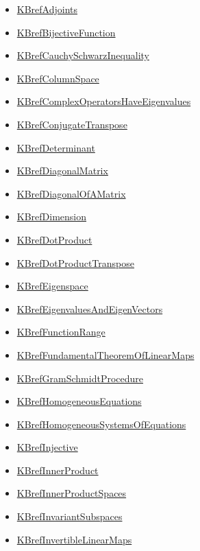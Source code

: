 \documentclass[11pt]{article}
\begin{document}
\begin{itemize}
\begin{itemize}
\item \href{math530/KBrefAdjoints.org}{KBrefAdjoints}
\item \href{math530/KBrefBijectiveFunction.org}{KBrefBijectiveFunction}
\item \href{math530/KBrefCauchySchwarzInequality.org}{KBrefCauchySchwarzInequality}
\item \href{math530/KBrefColumnSpace.org}{KBrefColumnSpace}
\item \href{math530/KBrefComplexOperatorsHaveEigenvalues.org}{KBrefComplexOperatorsHaveEigenvalues}
\item \href{math530/KBrefConjugateTranspose.org}{KBrefConjugateTranspose}
\item \href{math530/KBrefDeterminant.org}{KBrefDeterminant}
\item \href{math530/KBrefDiagonalMatrix.org}{KBrefDiagonalMatrix}
\item \href{math530/KBrefDiagonalOfAMatrix.org}{KBrefDiagonalOfAMatrix}
\item \href{math530/KBrefDimension.org}{KBrefDimension}
\item \href{math530/KBrefDotProduct.org}{KBrefDotProduct}
\item \href{math530/KBrefDotProductTranspose.org}{KBrefDotProductTranspose}
\item \href{math530/KBrefEigenspace.org}{KBrefEigenspace}
\item \href{math530/KBrefEigenvaluesAndEigenVectors.org}{KBrefEigenvaluesAndEigenVectors}
\item \href{math530/KBrefFunctionRange.org}{KBrefFunctionRange}
\item \href{math530/KBrefFundamentalTheoremOfLinearMaps.org}{KBrefFundamentalTheoremOfLinearMaps}
\item \href{math530/KBrefGramSchmidtProcedure.org}{KBrefGramSchmidtProcedure}
\item \href{math530/KBrefHomogeneousEquations.org}{KBrefHomogeneousEquations}
\item \href{math530/KBrefHomogeneousSystemsOfEquations.org}{KBrefHomogeneousSystemsOfEquations}
\item \href{math530/KBrefInjective.org}{KBrefInjective}
\item \href{math530/KBrefInnerProduct.org}{KBrefInnerProduct}
\item \href{math530/KBrefInnerProductSpaces.org}{KBrefInnerProductSpaces}
\item \href{math530/KBrefInvariantSubspaces.org}{KBrefInvariantSubspaces}
\item \href{math530/KBrefInvertibleLinearMaps.org}{KBrefInvertibleLinearMaps}

\end{itemize}
\end{itemize}
\end{document}
